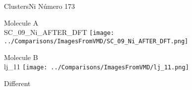 \vtab[-3cm]
\begin{center}
{\large ClustersNi \tab Número 173}
\end{center}
\begin{multicols}{2}
\begin{center}
Molecule A \\ 
SC\_09\_Ni\_AFTER\_DFT
\texttt{[image: ../Comparisons/ImagesFromVMD/SC\_09\_Ni\_AFTER\_DFT.png]}
\\
\vtab

\columnbreak
Molecule B \\ 
lj\_11
\texttt{[image: ../Comparisons/ImagesFromVMD/lj\_11.png]}
\\
\vtab


\end{center}
\end{multicols}
\begin{center}
\textcolor{NavyBlue}{\Large Different}
\end{center}

 \newpage

